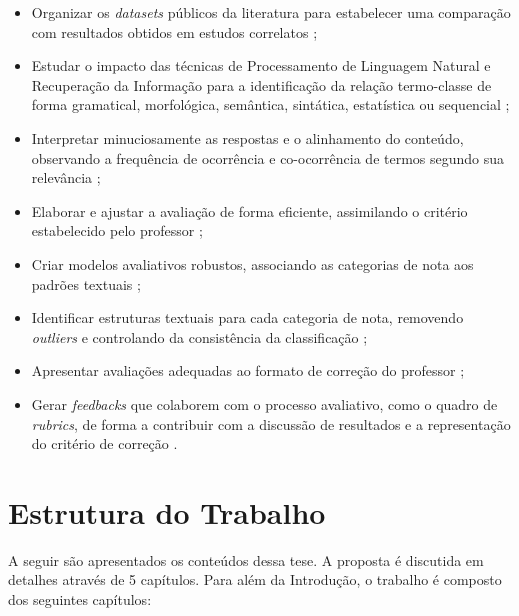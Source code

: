 \begin{itemize}
\item Organizar os \textit{datasets} públicos da literatura para estabelecer uma comparação com resultados obtidos em estudos correlatos \cite{burrows2015};
\item Estudar o impacto das técnicas de Processamento de Linguagem Natural e Recuperação da Informação para a identificação da relação termo-classe de forma gramatical, morfológica, semântica, sintática, estatística ou sequencial \cite{galhardi2018a, kumar2019, sahu2020};
\item Interpretar minuciosamente as respostas e o alinhamento do conteúdo, observando a frequência de ocorrência e co-ocorrência de termos segundo sua relevância \cite{jordan2012, saha2018, ding2020};
\item Elaborar e ajustar a avaliação de forma eficiente, assimilando o critério estabelecido pelo professor \cite{zesch2015, condor2020, lui2022};
\item Criar modelos avaliativos robustos, associando as categorias de nota aos padrões textuais \cite{butcher2010, heilman2015, burrows2015};
\item Identificar estruturas textuais para cada categoria de nota, removendo \textit{outliers} e controlando da consistência da classificação \cite{ding2020, filighera2020};
\item Apresentar avaliações adequadas ao formato de correção do professor \cite{higgins2014, funayama2020, pado2021};
\item Gerar \textit{feedbacks} que colaborem com o processo avaliativo, como o quadro de \textit{rubrics}, de forma a contribuir com a discussão de resultados e a representação do critério de correção \cite{mizumoto2019, suzen2020, bernius2022}.
\end{itemize}

\section{Estrutura do Trabalho}

A seguir são apresentados os conteúdos dessa tese. A proposta é discutida em detalhes através de 5 capítulos. Para além da Introdução, o trabalho é composto dos seguintes capítulos:

